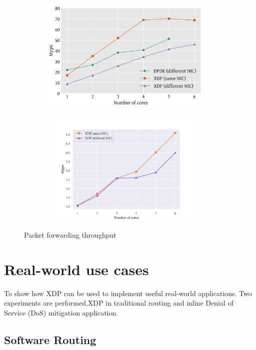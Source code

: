 \documentclass[12pt,titlepage]{article}
\begin{document}
\begin{figure}
    \centering
    \begin{minipage}{0.49\textwidth}
        \centering
        \includegraphics[width=0.95\textwidth,height=5.5cm]{original/redirect-test.pdf} %
        \label{graph:redirect:a}
    \end{minipage}\hfill
    \begin{minipage}{0.49\textwidth}
        \centering
        \includegraphics[width=0.95\textwidth,height=5.5cm]{img/redirect-test.pdf} %
        \label{graph:redirect:b}
    \end{minipage}
     \caption{Packet forwarding throughput}
     \label{graph:redirect}
\end{figure}


\section{Real-world use cases}

To show how XDP can be used to implement useful real-world applications. Two experiments are performed,XDP in  traditional routing and inline Denial of Service (DoS) mitigation application.  

\subsection{Software Routing}
\end{document}

